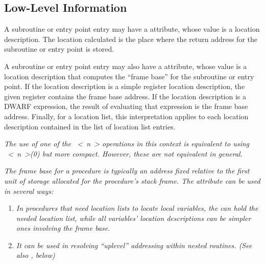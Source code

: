 \subsection{Low-Level Information}
\label{chap:lowlevelinformation}

A subroutine or entry point entry may have a 
attribute, whose value is a location description. The location
calculated is the place where the return address for the
subroutine or entry point is stored.

A subroutine or entry point entry may also have a
 attribute, whose value is a location
description that computes the “frame base” for the
subroutine or entry point. If the location description is
a simple register location description, the given register
contains the frame base address. If the location description is
a DWARF expression, the result of evaluating that expression
is the frame base address. Finally, for a location list,
this interpretation applies to each location description
contained in the list of location list entries.

\textit{The use of one of the ~\textless~n~\textgreater 
operations in this
context is equivalent to using 
~\textless~n~\textgreater(0) 
but more
compact. However, these are not equivalent in general.}

\textit{The frame base for a procedure is typically an address fixed
relative to the first unit of storage allocated for the
procedure’s stack frame. The  attribute
can be used in several ways:}

\begin{enumerate}[1.]
\item \textit{In procedures that need location lists to locate local
variables, the  can hold the needed location
list, while all variables’ location descriptions can be
simpler ones involving the frame base.}

\item \textit{It can be used in resolving ``up\dash level'' addressing
within nested routines. 
(See also , below)}
\end{enumerate}

